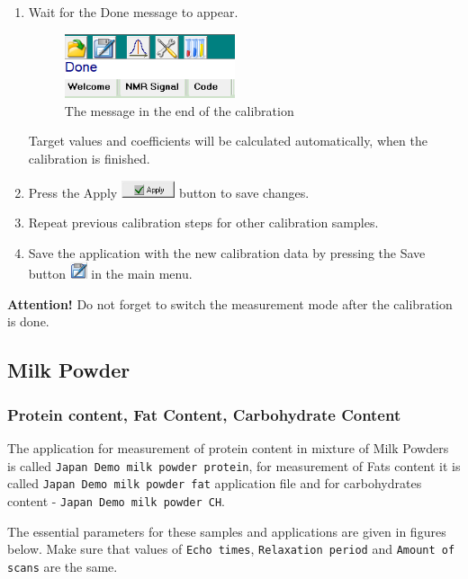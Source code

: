 \documentclass[a4paper,12pt]{article}
\begin{document}
\begin{enumerate}
\item Wait for the Done message to appear.

\begin{figure}[H]
\centering
\includegraphics[width=5cm]{Calibration_Done.PNG}
\caption{The message in the end of the calibration}
\label{fig:Cal_Completed}
\end{figure}

Target values and coefficients will be calculated automatically, when the calibration is finished. 

\item Press the Apply \includegraphics[height=0.5cm]{Settings_Ini_Apply.png} button to save changes.

\item Repeat previous calibration steps for other calibration samples.

\item Save the application with the new calibration data by pressing the Save button \includegraphics[width=0.5cm]{Btn_Save.png} in the main menu.
\end{enumerate}

\textbf{Attention!} Do not forget to switch the measurement mode after the calibration is done.

\subsection{Milk Powder}
\subsubsection{Protein content, Fat Content, Carbohydrate Content}

The application for measurement of protein content in mixture of Milk Powders is called
\texttt{Japan Demo milk powder protein}, for measurement of Fats content it is called \texttt{Japan Demo milk powder fat} application file and for carbohydrates content - \texttt{Japan Demo milk powder CH}. 

The essential parameters for these samples and applications are given in figures below.
Make sure that values of \texttt{Echo times},
\texttt{Relaxation period} and
\texttt{Amount of scans} are the same.
\end{document}
